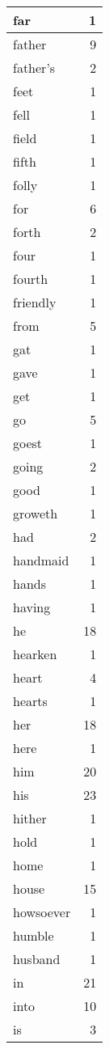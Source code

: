 \begin{center}
\begin{longtable}{l|r}
far & 1 \\ \hline
father & 9 \\ \hline
father's & 2 \\ \hline
feet & 1 \\ \hline
fell & 1 \\ \hline
field & 1 \\ \hline
fifth & 1 \\ \hline
folly & 1 \\ \hline
for & 6 \\ \hline
forth & 2 \\ \hline
four & 1 \\ \hline
fourth & 1 \\ \hline
friendly & 1 \\ \hline
from & 5 \\ \hline
gat & 1 \\ \hline
gave & 1 \\ \hline
get & 1 \\ \hline
go & 5 \\ \hline
goest & 1 \\ \hline
going & 2 \\ \hline
good & 1 \\ \hline
groweth & 1 \\ \hline
had & 2 \\ \hline
handmaid & 1 \\ \hline
hands & 1 \\ \hline
having & 1 \\ \hline
he & 18 \\ \hline
hearken & 1 \\ \hline
heart & 4 \\ \hline
hearts & 1 \\ \hline
her & 18 \\ \hline
here & 1 \\ \hline
him & 20 \\ \hline
his & 23 \\ \hline
hither & 1 \\ \hline
hold & 1 \\ \hline
home & 1 \\ \hline
house & 15 \\ \hline
howsoever & 1 \\ \hline
humble & 1 \\ \hline
husband & 1 \\ \hline
in & 21 \\ \hline
into & 10 \\ \hline
is & 3 \\ \hline

\end{longtable}
\end{center}
